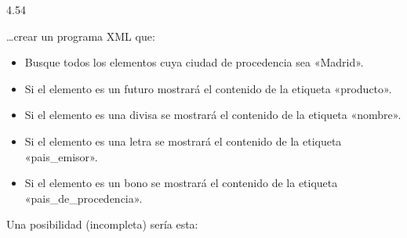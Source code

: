 \documentclass[letterpaper,10pt,spanish]{sphinxmanual}
\begin{document}
\begin{sphinxVerbatim}[commandchars=\\\{\}]
         
                4.54\PYGZpc{}
\end{sphinxVerbatim}

…crear un programa XML que:
\begin{itemize}
\item {} 
Busque todos los elementos cuya ciudad de procedencia sea «Madrid».

\item {} 
Si el elemento es un futuro mostrará el contenido de la etiqueta «producto».

\item {} 
Si el elemento es una divisa se mostrará el contenido de la etiqueta «nombre».

\item {} 
Si el elemento es una letra  se mostrará el contenido de la etiqueta «pais\_emisor».

\item {} 
Si el elemento es un bono  se mostrará el contenido de la etiqueta «pais\_de\_procedencia».

\end{itemize}

Una posibilidad (incompleta) sería esta:
\end{document}
